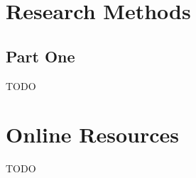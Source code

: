 \documentclass[sigconf]{acmart}
\begin{document}




\appendix

\section{Research Methods}

\subsection{Part One}
TODO

\section{Online Resources}
TODO
\end{document}
